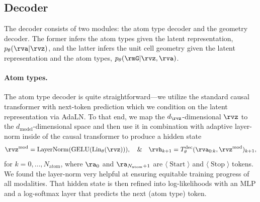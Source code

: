 \documentclass{article}
\theoremstyle{plain}
\theoremstyle{definition}
\theoremstyle{remark}
\begin{document}
\subsection{Decoder}
\label{sub:dec}
The decoder consists of two modules: the atom type decoder and the geometry decoder. The former infers the atom types given the latent representation, $p_{\theta}(\rva|\rvz)$, and the latter infers the unit cell geometry given the latent representation and the atom types, $p_{\theta}(\rmG|\rvz, \rva)$.

\vspace{-5pt}
\paragraph{Atom types.} The atom type decoder is quite straightforward---we utilize the standard causal transformer with next-token prediction which we condition on the latent representation via AdaLN. 
To that end, we map the $d_{\rvz}$-dimensional $\rvz$ to the $d_{\text{model}}$-dimensional space and then use it in combination with adaptive layer-norm inside of the causal transformer to produce a hidden state 
\begin{align}
    \rvz^{\text{mod}} = \operatorname{LayerNorm}(\operatorname{GELU}(\operatorname{Lin}_{\theta}(\rvz))),
    \label{eq:atom-type-mod}
    \quad \& \quad 
    \rvh_{k+1} = T^{\text{dec}}_{\theta}(\rva_{0:k}, \rvz^{\text{mod}})_{k+1},
\end{align}
for $k=0, \dots, N_{\text{atom}}$, where $\ra_{0}$ and $\ra_{N_{\text{atom}}+1}$ are $\langle\operatorname{Start}\rangle$ and $\langle\operatorname{Stop}\rangle$ tokens.
We found the layer-norm very helpful at ensuring equitable training progress of all modalities.
That hidden state is then refined into log-likelihoods with an MLP and a log-softmax layer that predicts the next (atom type) token.
\end{document}
